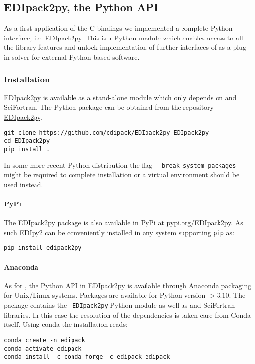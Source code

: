 \documentclass[edipack2.tex]{subfiles}
\begin{document}




\subsection{EDIpack2py, the Python API}\label{sSecInteropEDIpy}
As a first application of the \NAME C-bindings we implemented a
complete Python interface, i.e. EDIpack2py. This is a Python module which
enables access to all the library features and unlock implementation of
further interfaces of \NAME as a plug-in solver for external Python
based software.    


\subsubsection{Installation}\label{sSecInteropEDIpyInstallation}
EDIpack2py is available as a stand-alone
module which only depends on \NAME and SciFortran.
The Python package can be obtained from the repository
\href{https://github.com/EDIpack/EDIpack2py}{EDIpack2py}.

\begin{lstlisting}[style=mybash]
git clone https://github.com/edipack/EDIpack2py EDIpack2py
cd EDIpack2py
pip install . 
\end{lstlisting}
In some more recent Python distribution the flag {\tt
  --break-system-packages} might be required to complete
installation or a virtual environment should be used instead. 


\paragraph{PyPi}
The EDIpack2py package is also available in PyPi at
\href{https://pypi.org/project/EDIpack2py/}{pypi.org/EDIpack2py}. As such
EDIpy2 can be conveniently installed in any system supporting {\tt pip} as:

\begin{lstlisting}[style=mybash]
pip install edipack2py
\end{lstlisting}


\paragraph{Anaconda}
As for \NAME, the Python API in EDIpack2py is available through
Anaconda packaging for Unix/Linux systems. Packages are available for
Python version $>3.10$. The \NAME package contains the {\tt
  EDIpack2py} Python module as well as \NAME and SciFortran
libraries. In this case the resolution of the dependencies is
taken care from Conda itself. 
Using conda the installation reads:
\begin{lstlisting}[style=mybash]
conda create -n edipack
conda activate edipack
conda install -c conda-forge -c edipack edipack
\end{lstlisting}
\end{document}
